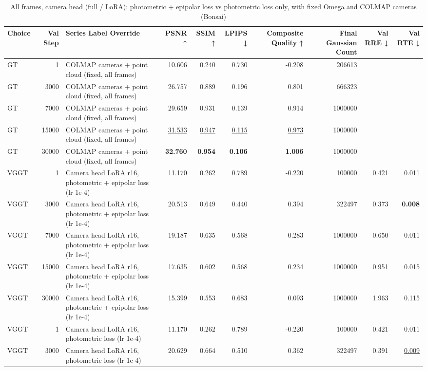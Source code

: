 \begin{table}[H]
\caption{\ifdefined\customcaption \customcaption \else All frames, camera head (full / LoRA): photometric + epipolar loss vs photometric loss only, with fixed Omega and COLMAP cameras (Bonsai) \fi}
\label{tab:118_omega_epi_all_heads_bonsai}
\centering
\tiny
\begin{tabular}{lrlrrrrrrr}
\toprule
Choice & Val Step & Series Label Override & PSNR ↑ & SSIM ↑ & LPIPS ↓ & Composite Quality ↑ & Final Gaussian Count & Val RRE ↓ & Val RTE ↓ \\
\midrule
GT & 1 & COLMAP cameras + point cloud (fixed, all frames) & 10.606 & 0.240 & 0.730 & -0.208 & 206613 &  &  \\
GT & 3000 & COLMAP cameras + point cloud (fixed, all frames) & 26.757 & 0.889 & 0.196 & 0.801 & 666323 &  &  \\
GT & 7000 & COLMAP cameras + point cloud (fixed, all frames) & 29.659 & 0.931 & 0.139 & 0.914 & 1000000 &  &  \\
GT & 15000 & COLMAP cameras + point cloud (fixed, all frames) & \underline{31.533} & \underline{0.947} & \underline{0.115} & \underline{0.973} & 1000000 &  &  \\
GT & 30000 & COLMAP cameras + point cloud (fixed, all frames) & \textbf{32.760} & \textbf{0.954} & \textbf{0.106} & \textbf{1.006} & 1000000 &  &  \\
VGGT & 1 & Camera head LoRA r16, photometric + epipolar loss (lr 1e-4) & 11.170 & 0.262 & 0.789 & -0.220 & 100000 & 0.421 & 0.011 \\
VGGT & 3000 & Camera head LoRA r16, photometric + epipolar loss (lr 1e-4) & 20.513 & 0.649 & 0.440 & 0.394 & 322497 & 0.373 & \textbf{0.008} \\
VGGT & 7000 & Camera head LoRA r16, photometric + epipolar loss (lr 1e-4) & 19.187 & 0.635 & 0.568 & 0.283 & 1000000 & 0.650 & 0.011 \\
VGGT & 15000 & Camera head LoRA r16, photometric + epipolar loss (lr 1e-4) & 17.635 & 0.602 & 0.568 & 0.234 & 1000000 & 0.951 & 0.015 \\
VGGT & 30000 & Camera head LoRA r16, photometric + epipolar loss (lr 1e-4) & 15.399 & 0.553 & 0.683 & 0.093 & 1000000 & 1.963 & 0.115 \\
VGGT & 1 & Camera head LoRA r16, photometric loss (lr 1e-4) & 11.170 & 0.262 & 0.789 & -0.220 & 100000 & 0.421 & 0.011 \\
VGGT & 3000 & Camera head LoRA r16, photometric loss (lr 1e-4) & 20.629 & 0.664 & 0.510 & 0.362 & 322497 & 0.391 & \underline{0.009} \\

\end{tabular}
\end{table}
